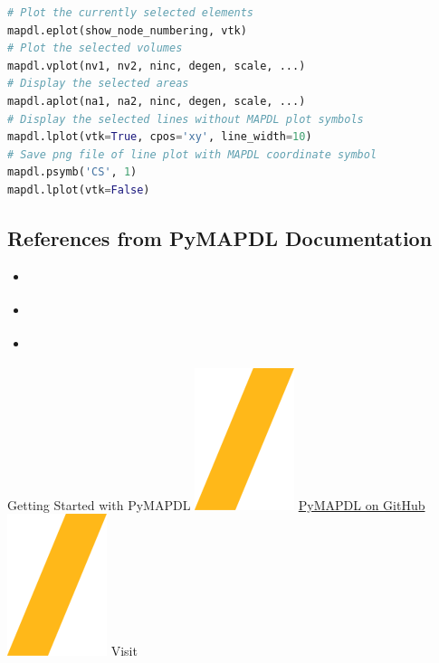 \documentclass[9pt,landscape]{article}
\begin{document}
\begin{multicols}{3}
\begin{lstlisting}[language=Python]
# Plot the currently selected elements
mapdl.eplot(show_node_numbering, vtk)
# Plot the selected volumes
mapdl.vplot(nv1, nv2, ninc, degen, scale, ...)
# Display the selected areas
mapdl.aplot(na1, na2, ninc, degen, scale, ...)
# Display the selected lines without MAPDL plot symbols
mapdl.lplot(vtk=True, cpos='xy', line_width=10)
# Save png file of line plot with MAPDL coordinate symbol
mapdl.psymb('CS', 1)
mapdl.lplot(vtk=False)
\end{lstlisting} 
\vfill

\subsection{References from PyMAPDL Documentation}
\begin{itemize}
\item \href{https://mapdl.docs.pyansys.com/version/stable/getting_started/index.html}{\color{blue}{Getting Started}}
\item \href{https://mapdl.docs.pyansys.com/version/stable/mapdl_commands/index.html}{\color{blue}{MAPDL Commands}}
\item \href{https://mapdl.docs.pyansys.com/version/stable/api/index.html}{\color{blue}{API Reference}}
\end{itemize}
\end{multicols}
\vspace{-0.15cm}
\noindent\makebox[\linewidth]{\rule{\paperwidth}{4pt}}
\begin{center}
Getting Started with PyMAPDL \includegraphics[height=\fontcharht\font`\S]{slash.png} \href{https://github.com/ansys/pymapdl}{{\color{blue}PyMAPDL on GitHub}} \includegraphics[height=\fontcharht\font`\S]{slash.png} Visit 
\end{center}
\end{document}
